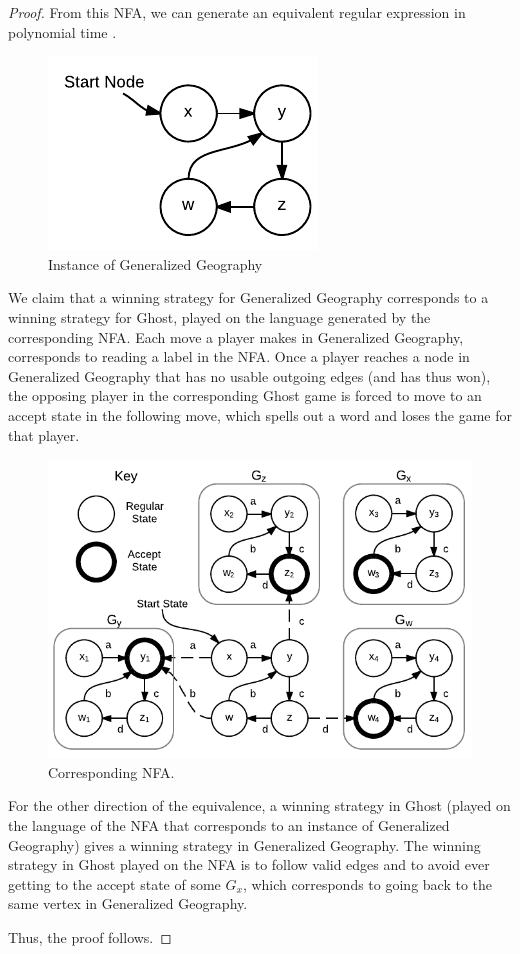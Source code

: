 \documentclass[runningheads,a4paper]{llncs}
\begin{document}
\begin{proof}
From this NFA, we can generate an equivalent regular expression in polynomial time \cite{theoryofcomp}.
\begin{figure}
\centering
\includegraphics[width=0.3\linewidth]{Ghost1.pdf}
\caption{Instance of Generalized Geography}
\label{fig:instance}
\end{figure}

We claim that a winning strategy for Generalized Geography corresponds to a winning strategy for Ghost, played on the language generated by the corresponding NFA. Each move a player makes in Generalized Geography, corresponds to reading a label in the NFA. Once a player reaches a node in Generalized Geography that has no usable outgoing edges (and has thus won), the opposing player in the corresponding Ghost game is forced to move to an accept state in the following move, which spells out a word and loses the game for that player. 


\begin{figure}
\centering
\includegraphics[width=0.6\linewidth]{Ghost2.pdf}
\caption{Corresponding NFA.}
\label{fig:reduction}
\end{figure}

For the other direction of the equivalence, a winning strategy in Ghost (played on the language of the NFA that corresponds to an instance of Generalized Geography) gives a winning strategy in Generalized Geography. The winning strategy in Ghost played on the NFA is to follow valid edges and to avoid ever getting to the accept state of some $G_x$, which corresponds to going back to the same vertex in Generalized Geography.

Thus, the proof follows. 
\end{proof}
\end{document}
